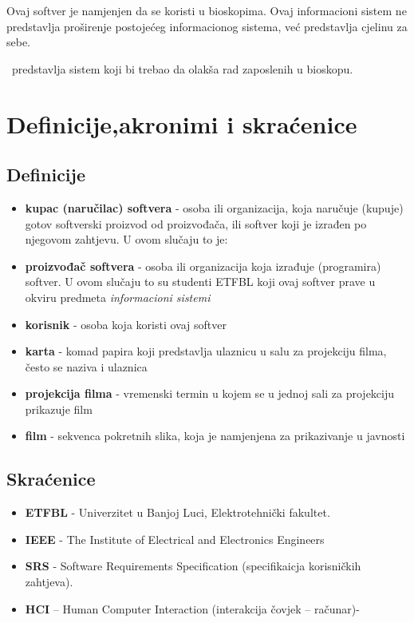 Ovaj softver je namjenjen da se koristi u bioskopima. Ovaj informacioni sistem ne predstavlja proširenje postojećeg informacionog sistema, već predstavlja cjelinu za sebe.

\naziv \ predstavlja sistem koji bi trebao da olakša rad zaposlenih u bioskopu. 
\section{Definicije,akronimi i skraćenice}
\subsection{Definicije}
\begin{itemize}
\item \textbf{kupac (naručilac) softvera} - osoba ili organizacija, koja naručuje (kupuje) gotov softverski proizvod od proizvođača, ili softver koji je izrađen po njegovom zahtjevu. U ovom slučaju to je:
\item \textbf{proizvođač softvera} - osoba ili organizacija koja izrađuje (programira) softver. U ovom slučaju to su studenti ETFBL koji ovaj softver prave u okviru predmeta \textit{informacioni sistemi}
\item \textbf{korisnik} - osoba koja koristi ovaj softver
\item \textbf{karta} - komad papira koji predstavlja ulaznicu u salu za projekciju filma, često se naziva i ulaznica
\item \textbf{projekcija filma} - vremenski termin u kojem se u jednoj sali za projekciju prikazuje film
\item \textbf{film} - sekvenca pokretnih slika, koja je namjenjena za prikazivanje u javnosti
\end{itemize}

\subsection{Skraćenice}
\begin{itemize}
\item \textbf{ETFBL} - Univerzitet u Banjoj Luci, Elektrotehnički fakultet.
\item \textbf{IEEE} - The Institute of Electrical and Electronics Engineers
\item \textbf{SRS} - Software Requirements Specification (specifikaicja korisničkih zahtjeva).
\item \textbf{HCI} – Human Computer Interaction (interakcija čovjek – računar)- 
\end{itemize}

